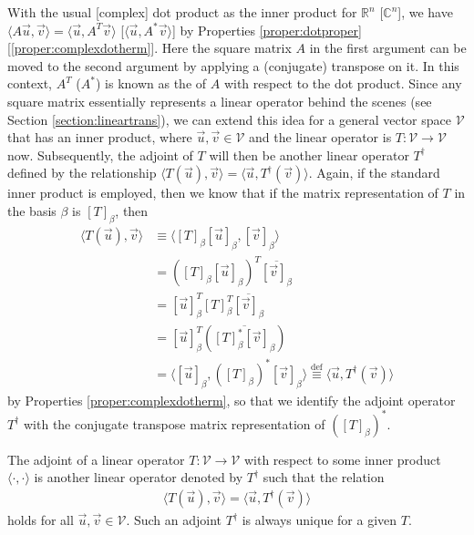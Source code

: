 With the usual [complex] dot product as the inner product for $\mathbb{R}^n$ [$\mathbb{C}^n$], we have $\langle A\vec{u}, \vec{v} \rangle = \langle \vec{u}, A^T\vec{v} \rangle$ [$\langle \vec{u}, A^*\vec{v} \rangle$] by Properties \ref{proper:dotproper} [\ref{proper:complexdotherm}]. Here the square matrix $A$ in the first argument can be moved to the second argument by applying a (conjugate) transpose on it. In this context, $A^T$ ($A^*$) is known as the  of $A$ with respect to the dot product. Since any square matrix essentially represents a linear operator behind the scenes (see Section \ref{section:lineartrans}), we can extend this idea for a general vector space $\mathcal{V}$ that has an inner product, where $\vec{u}, \vec{v} \in \mathcal{V}$ and the linear operator is $T: \mathcal{V} \to \mathcal{V}$ now. Subsequently, the adjoint of $T$ will then be another linear operator $T^\dag$ defined by the relationship $\langle T(\vec{u}), \vec{v} \rangle = \langle \vec{u}, T^\dag(\vec{v}) \rangle$. Again, if the standard inner product is employed, then we know that if the matrix representation of $T$ in the basis $\beta$ is $[T]_\beta$, then
\begin{align}
\langle T(\vec{u}), \vec{v} \rangle &\equiv \langle [T]_\beta[\vec{u}]_\beta, [\vec{v}]_\beta \rangle \nonumber \\
&= ([T]_\beta[\vec{u}]_\beta)^T\overline{[\vec{v}]_\beta} \nonumber \\
&= [\vec{u}]_\beta^T[T]_\beta^T\overline{[\vec{v}]_\beta} \nonumber \\
&= [\vec{u}]_\beta^T (\overline{[T]_\beta^*[\vec{v}]_\beta}) \nonumber \\
&= \langle [\vec{u}]_\beta, ([T]_\beta)^*[\vec{v}]_\beta \rangle \stackrel{\text{def}}{\equiv} \langle \vec{u}, T^\dag(\vec{v}) \rangle
\end{align}
by Properties \ref{proper:complexdotherm}, so that we identify the adjoint operator $T^\dag$ with the conjugate transpose matrix representation of $([T]_\beta)^*$. 
\begin{defn}[Adjoint]
\label{defn:adjoint}
The adjoint of a linear operator $T: \mathcal{V} \to \mathcal{V}$ with respect to some inner product $\langle \cdot, \cdot \rangle$ is another linear operator denoted by $T^\dag$ such that the relation
\begin{align}
\langle T(\vec{u}), \vec{v} \rangle = \langle \vec{u}, T^\dag(\vec{v}) \rangle    
\end{align}
holds for all $\vec{u}, \vec{v} \in \mathcal{V}$. Such an adjoint $T^\dag$ is always unique for a given $T$. 
\end{defn}
